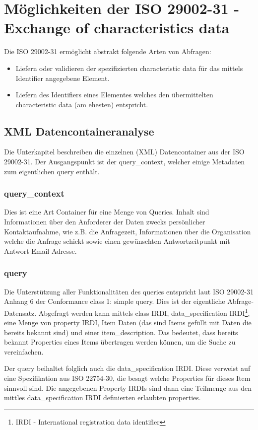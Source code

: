 \section{Möglichkeiten der ISO 29002-31 - Exchange of characteristics data}

Die ISO 29002-31 ermöglicht abstrakt folgende Arten von Abfragen:
\begin{itemize}
\item Liefern oder validieren der spezifizierten characteristic data für das mittels Identifier angegebene Element.
\item Liefern des Identifiers eines Elementes welches den übermittelten characteristic data (am ehesten) entspricht. 
\end{itemize}

\subsection{XML Datencontaineranalyse}
Die Unterkapitel beschreiben die einzelnen (XML) Datencontainer aus der ISO 29002-31. Der Ausgangspunkt ist der query\_context, welcher einige Metadaten zum eigentlichen query enthält. 

\subsubsection{query\_context}
Dies ist eine Art Container für eine Menge von Queries. Inhalt sind Informationen über den Anforderer der Daten zwecks persönlicher Kontaktaufnahme, wie z.B. die Anfragezeit, Informationen über die Organisation welche die Anfrage schickt sowie einen gewünschten Antwortzeitpunkt mit Antwort-Email Adresse. 


\subsubsection{query}
Die Unterstützung aller Funktionalitäten des queries entspricht laut ISO 29002-31 Anhang 6 der Conformance class 1: simple query.
Dies ist der eigentliche Abfrage-Datensatz. Abgefragt werden kann mittels class IRDI, data\_specification IRDI\footnote{IRDI  - International registration data identifier}, eine Menge von property IRDI, Item Daten (das sind Items gefüllt mit Daten die bereits bekannt sind) und einer item\_description. Das bedeutet, dass bereits bekannt Properties eines Items übertragen werden können, um die Suche zu vereinfachen.

Der query beihaltet folglich auch die data\_specification IRDI. Diese verweist auf eine Spezifikation aus ISO 22754-30, die besagt welche Properties für dieses Item sinnvoll sind. Die angegebenen Property IRDIs sind dann eine Teilmenge aus den mittles data\_specification IRDI definierten erlaubten properties. 

